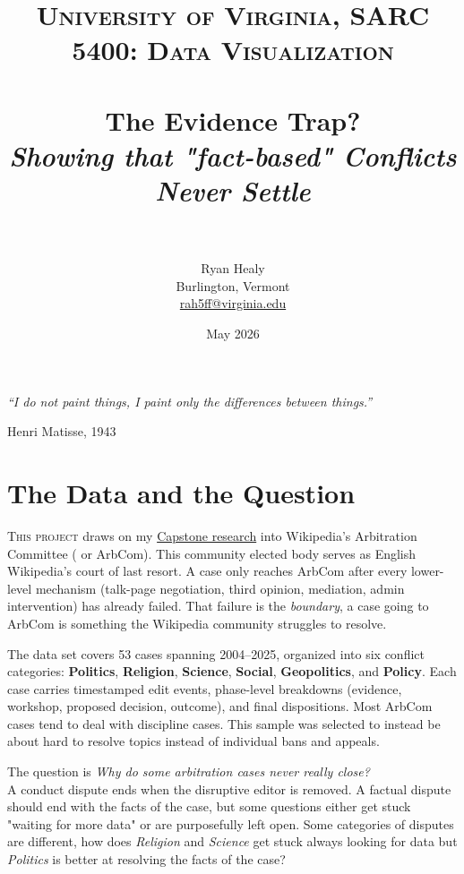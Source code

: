 \documentclass[a4paper, 11pt]{article}
\title{
\normalfont \normalsize
\textsc{University of Virginia, SARC 5400: Data Visualization} \\ [25pt]
\horrule{0.5pt} \\[0.4cm]
\huge\color{ev} The Evidence Trap? \\[0.3cm]
\large \textit{Showing that "fact-based" Conflicts Never Settle} \\
\horrule{2pt} \\[0.5cm]
}
\author{Ryan Healy \\
\small Burlington, Vermont \\
\small \href{mailto:rah5ff@virginia.edu}{rah5ff@virginia.edu}}
\date{\normalsize May 2026}
\begin{document}

\maketitle

\epigraph{\textit{``I do not paint things, I paint only the differences between things.''}}{Henri Matisse, 1943}

\vspace{4pt}


\section{The Data and the Question}

\lettrine[lines=2, loversize=0.1]{T}{his project} draws on my
\href{https://github.com/rah-ds/Wikipedia_Dispute_Models}{Capstone research}
into Wikipedia's Arbitration Committee ( or ArbCom). This community elected body serves as
English Wikipedia's court of last resort.
A case only reaches ArbCom after every lower-level mechanism (talk-page negotiation,
third opinion, mediation, admin intervention) has already failed.
That failure is the \textit{boundary}, a case going to ArbCom is something the Wikipedia community struggles to resolve.


The data set covers 53 cases spanning 2004--2025, organized into six conflict
categories: \textbf{Politics}, \textbf{Religion}, \textbf{Science},
\textbf{Social}, \textbf{Geopolitics}, and \textbf{Policy}.
Each case carries timestamped edit events, phase-level breakdowns
(evidence, workshop, proposed decision, outcome), and final dispositions. Most ArbCom cases tend to deal with discipline cases. This sample was selected to instead be about hard to resolve topics instead of individual bans and appeals.

The question is 
\textit{Why do some arbitration cases never really close?} \\

A conduct dispute ends when the disruptive editor is removed.
A factual dispute should end with the facts of the case, but some questions either get stuck "waiting for more data" or are purposefully left open. Some categories of disputes are different, how does \textit{Religion }and \textit{Science} get stuck always looking for data but \textit{Politics} is better at resolving the facts of the case?
\end{document}
